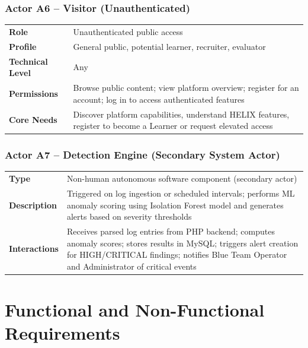 \documentclass[12pt,a4paper]{report}
\begin{document}
	\subsection{Actor A6 -- Visitor (Unauthenticated)}
	\begin{infobox}[title=Visitor]
		\begin{tabular}{L{3.8cm} L{8.8cm}}
			\textbf{Role} & Unauthenticated public access \\
			\textbf{Profile} & General public, potential learner, recruiter, evaluator \\
			\textbf{Technical Level} & Any \\
			\textbf{Permissions} & Browse public content; view platform overview; register for an account; log in to access authenticated features \\
			\textbf{Core Needs} & Discover platform capabilities, understand HELIX features, register to become a Learner or request elevated access \\
		\end{tabular}
	\end{infobox}
	
	\subsection{Actor A7 -- Detection Engine (Secondary System Actor)}
	\begin{sectionbox}
		\begin{tabular}{L{3.8cm} L{8.8cm}}
			\textbf{Type} & Non-human autonomous software component (secondary actor) \\
			\textbf{Description} & Triggered on log ingestion or scheduled intervals; performs ML anomaly scoring using Isolation Forest model and generates alerts based on severity thresholds \\
			\textbf{Interactions} & Receives parsed log entries from PHP backend; computes anomaly scores; stores results in MySQL; triggers alert creation for HIGH/CRITICAL findings; notifies Blue Team Operator and Administrator of critical events \\
		\end{tabular}
	\end{sectionbox}
	
	\chapter{Functional and Non-Functional Requirements}
	
\end{document}
